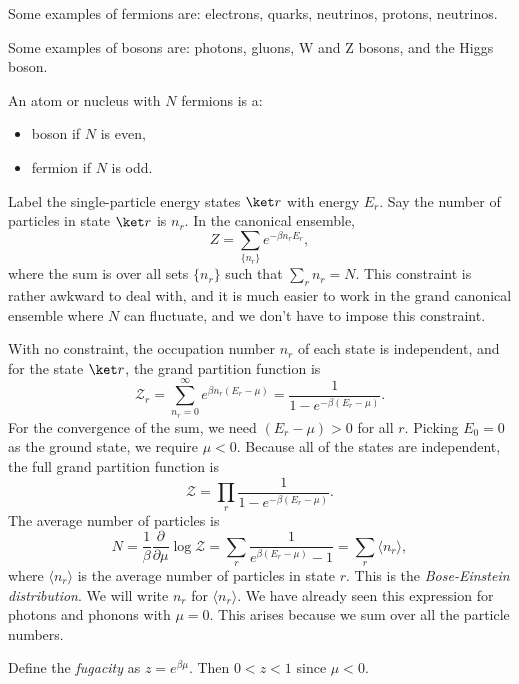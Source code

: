 \documentclass[12pt]{article}
\begin{document}
\begin{exbox}
	Some examples of fermions are: electrons, quarks, neutrinos, protons, neutrinos.

	Some examples of bosons are: photons, gluons, W and Z bosons, and the Higgs boson.

	An atom or nucleus with $N$ fermions is a:
	\begin{itemize}
		\item boson if $N$ is even,
		\item fermion if $N$ is odd.
	\end{itemize}
\end{exbox}

Label the single-particle energy states $\ket r$ with energy $E_r$. Say the number of particles in state $\ket r$ is $n_r$. In the canonical ensemble, 
\[
	Z = \sum_{\{n_r\}} e^{-\beta n_r E_r},
\]
where the sum is over all sets $\{n_r\}$ such that $\sum_r n_r = N$. This constraint is rather awkward to deal with, and it is much easier to work in the grand canonical ensemble where $N$ can fluctuate, and we don't have to impose this constraint.

With no constraint, the occupation number $n_r$ of each state is independent, and for the state $\ket r$, the grand partition function is
\[
\mathcal Z_r = \sum_{n_r = 0}^\infty e^{\beta n_r(E_r - \mu)} = \frac{1}{1 - e^{-\beta(E_r - \mu)}}.
\]
For the convergence of the sum, we need $(E_r- \mu) > 0$ for all $r$. Picking $E_0 = 0$ as the ground state, we require $\mu < 0$. Because all of the states are independent, the full grand partition function is
\[
\mathcal Z = \prod_r \frac{1}{1 - e^{-\beta(E_r - \mu)}}.
\]
The average number of particles is
\[
N = \frac{1}{\beta} \frac{\partial}{\partial \mu} \log \mathcal Z = \sum_r \frac{1}{e^{\beta(E_r - \mu)} - 1} = \sum_r \langle n_r \rangle,
\]
where $\langle n_r \rangle$ is the average number of particles in state $r$. This is the \emph{Bose-Einstein distribution}. We will write $n_r$ for $\langle n_r \rangle$. We have already seen this expression for photons and phonons with $\mu = 0$. This arises because we sum over all the particle numbers.

Define the \emph{fugacity} as $z = e^{\beta \mu}$. Then $0 < z < 1$ since $\mu < 0$.
\end{document}
